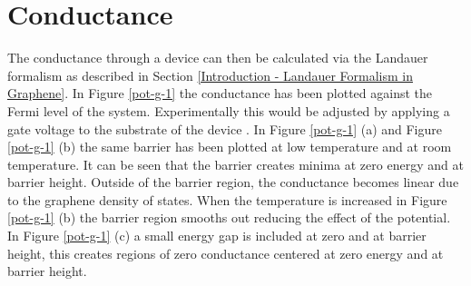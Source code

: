 \documentclass[12pt,a4paper]{report}
\begin{document}
		\section{Conductance}
		\label{Rectangular Barrier - Conductance}
	The conductance through a device can then be calculated via the Landauer formalism as described in Section \ref{Introduction - Landauer Formalism in Graphene}. In Figure \ref{pot-g-1} the conductance has been plotted against the Fermi level of the system. Experimentally this would be adjusted by applying a gate voltage to the substrate of the device \cite{b46}. In Figure \ref{pot-g-1} (a) and Figure \ref{pot-g-1} (b) the same barrier has been plotted at low temperature and at room temperature. It can be seen that the barrier creates minima at zero energy and at barrier height. Outside of the barrier region, the conductance becomes linear due to the graphene density of states. When the temperature is increased in Figure \ref{pot-g-1} (b) the barrier region smooths out reducing the effect of the potential. In Figure \ref{pot-g-1} (c) a small energy gap is included at zero and at barrier height, this creates regions of zero conductance centered at zero energy and at barrier height.
\end{document}
